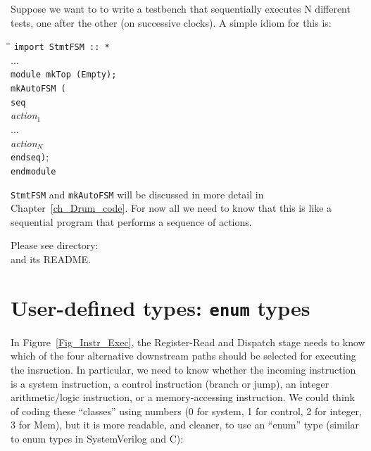 Suppose we want to to write a testbench that sequentially executes N
different tests, one after the other (on successive clocks).  A simple
idiom for this is:

{\footnotesize
\begin{tabbing}
\hmmm \= \hm \= \hm \= \hm \= \kill
      \> {\tt import StmtFSM :: *} \\
      \> ... \\
      \> {\tt module mkTop (Empty);} \\
      \>     \> {\tt mkAutoFSM (} \\
      \>     \>     \> {\tt seq} \\
      \>     \>     \>     \> \emph{action$_1$} \\
      \>     \>     \>     \> ... \\
      \>     \>     \>     \> \emph{action$_N$} \\
      \>     \>     \> {\tt endseq)}; \\
      \> {\tt endmodule}
\end{tabbing}}

{\tt StmtFSM} and \verb|mkAutoFSM| will be discussed in more detail in
Chapter~\ref{ch_Drum_code}.  For now all we need to know that this is
like a sequential program that performs a sequence of actions.

\Beginexercise

Please see directory:  \\
and its README.
\Endexercise


\section{User-defined types: {\tt enum} types}

\label{BSV_enum_types}


In Figure~\ref{Fig_Instr_Exec}, the Register-Read and Dispatch stage
needs to know which of the four alternative downstream paths should be
selected for executing the insruction.  In particular, we need to know
whether the incoming instruction is a system instruction, a control
instruction (branch or jump), an integer arithmetic/logic instruction,
or a memory-accessing instruction.  We could think of coding these
``classes'' using numbers (0 for system, 1 for control, 2 for integer,
3 for Mem), but it is more readable, and cleaner, to use an ``enum''
type (similar to enum types in SystemVerilog and C):

